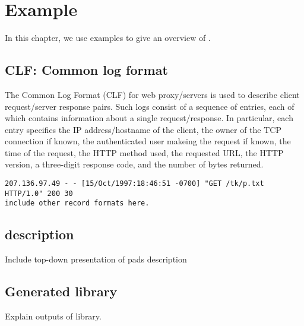\chapter{Example}
\label{chap:example}
In this chapter, we use examples to give an overview of \pads{}.

\section{CLF: Common log format}
\label{sec:example:common-log-format}
The Common Log Format (CLF) \cite{clf} for web proxy/servers is used
to describe client request/server response pairs.  Such logs consist
of a sequence of entries, each of which contains information about a
single request/response.  In particular, each entry specifies the IP
address/hostname of the client, the owner of the TCP connection if
known, the authenticated user makeing the request if known, the time
of the request, the HTTP method used, the requested URL, the HTTP
version, a three-digit response code, and the number of bytes
returned. 

\begin{verbatim}
207.136.97.49 - - [15/Oct/1997:18:46:51 -0700] "GET /tk/p.txt HTTP/1.0" 200 30
include other record formats here.
\end{verbatim}

\section{\padsl{} description}
\label{sec:example:padsl-description}
Include top-down presentation of pads description

\section{Generated library}
\label{sec:example:generated-library}
Explain outputs of library.